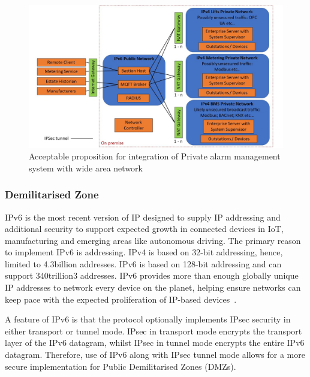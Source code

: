 \documentclass[11pt, oneside]{book}   	%
\begin{document}
\pagebreak

\FloatBarrier
\begin{figure}
\begin{center}
\includegraphics[width=1\textwidth]{acceptablePublicNetwork.jpg}
\caption{Acceptable proposition for integration of Private alarm management system with wide area network}
\label{Integrated Network Configuration figure}
\end{center}
\end{figure}
\FloatBarrier

\pagebreak

\subsubsection{Demilitarised Zone}
IPv6 is the most recent version of IP designed to supply IP addressing and additional security to support expected growth in connected devices in IoT, manufacturing and emerging areas like autonomous driving.
The primary reason to implement IPv6 is addressing. 
IPv4 is based on 32-bit addressing, hence, limited to 4.3billion addresses.
IPv6 is based on 128-bit addressing and can support 340trillion3 addresses.
IPv6 provides more than enough globally unique IP addresses to network every device on the planet, helping ensure networks can keep pace with the expected proliferation of IP-based devices~\cite{ipv6}.\

A feature of IPv6 is that the protocol optionally implements IPsec security in either transport or tunnel mode.
IPsec in transport mode encrypts the transport layer of the IPv6 datagram, whilst IPsec in tunnel mode encrypts the entire IPv6 datagram.
Therefore, use of IPv6 along with IPsec tunnel mode allows for a more secure implementation for Public Demilitarised Zones (DMZs).\
\end{document}
